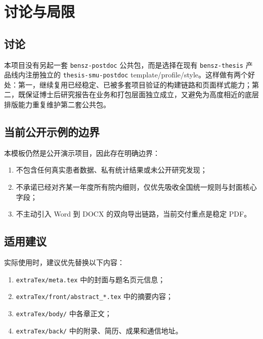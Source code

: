 \chapter{讨论与局限}

\section{讨论}

本项目没有另起一套 \texttt{bensz-postdoc} 公共包，而是选择在现有 \texttt{bensz-thesis} 产品线内注册独立的 \texttt{thesis-smu-postdoc} template/profile/style。这样做有两个好处：第一，继续复用已经稳定、已被多套项目验证的构建链路和页面样式能力；第二，既保证博士后研究报告在业务和打包层面独立成立，又避免为高度相近的底层排版能力重复维护第二套公共包。

\section{当前公开示例的边界}

本模板仍然是公开演示项目，因此存在明确边界：

\begin{enumerate}
  \item 不包含任何真实患者数据、私有统计结果或未公开研究发现；
  \item 不承诺已经对齐某一年度所有院内细则，仅优先吸收全国统一规则与封面核心字段；
  \item 不主动引入 Word 到 DOCX 的双向导出链路，当前交付重点是稳定 PDF。
\end{enumerate}

\section{适用建议}

实际使用时，建议优先替换以下内容：

\begin{enumerate}
  \item \texttt{extraTex/meta.tex} 中的封面与题名页元信息；
  \item \texttt{extraTex/front/abstract\_*.tex} 中的摘要内容；
  \item \texttt{extraTex/body/} 中各章正文；
  \item \texttt{extraTex/back/} 中的附录、简历、成果和通信地址。
\end{enumerate}
